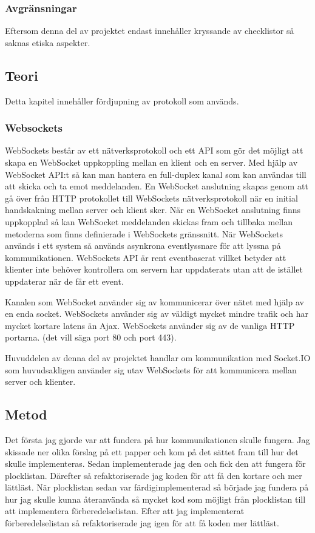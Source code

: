 \subsubsection{Avgränsningar}
Eftersom denna del av projektet endast innehåller kryssande av checklistor så saknas etiska aspekter.

\pagebreak
\subsection{Teori}
Detta kapitel innehåller fördjupning av protokoll som används.
\subsubsection{Websockets}
WebSockets består av ett nätverksprotokoll och ett API som gör det möjligt att skapa en WebSocket uppkoppling mellan en klient och en server. Med hjälp av WebSocket API:t så kan man hantera en full-duplex kanal som kan användas till att skicka och ta emot meddelanden. En WebSocket anslutning skapas genom att gå över från HTTP protokollet till WebSockets nätverksprotokoll när en initial handskakning mellan server och klient sker. När en WebSocket anslutning finns uppkopplad så kan WebSocket meddelanden skickas fram och tillbaka mellan metoderna som finns definierade i WebSockets gränssnitt. När WebSockets används i ett system så används asynkrona eventlyssnare för att lyssna på kommunikationen. WebSockets API är rent eventbaserat villket betyder att klienter inte behöver kontrollera om servern har uppdaterats utan att de istället uppdaterar när de får ett event. \cite{websocketbook}

Kanalen som WebSocket använder sig av kommunicerar över nätet med hjälp av en enda socket. WebSockets använder sig av väldigt mycket mindre trafik och har mycket kortare latens än Ajax. WebSockets använder sig av de vanliga HTTP portarna. (det vill säga port 80 och port 443). \cite{websocketreport}

Huvuddelen av denna del av projektet handlar om kommunikation med Socket.IO som huvudsakligen använder sig utav WebSockets för att kommunicera mellan server och klienter.
 
\subsection{Metod}
Det första jag gjorde var att fundera på hur kommunikationen skulle fungera. Jag skissade ner olika förslag på ett papper och kom på det sättet fram till hur det skulle implementeras. Sedan implementerade jag den och fick den att fungera för plocklistan. Därefter så refaktoriserade jag koden för att få den kortare och mer lättläst. När plocklistan sedan var färdigimplementerad så började jag fundera på hur jag skulle kunna återanvända så mycket kod som möjligt från plocklistan till att implementera förberedelselistan. Efter att jag implementerat förberedelselistan så refaktoriserade jag igen för att få koden mer lättläst.
\pagebreak


